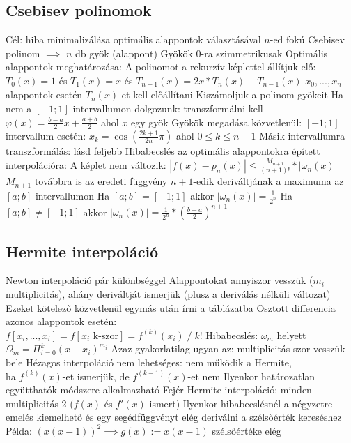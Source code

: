 \documentclass[12pt,a4paper]{article}
\begin{document}
\pagebreak

\subsection{Csebisev polinomok}

\begin{outline}
	\1 Cél: hiba minimalizálása optimális alappontok választásával
	\1 $n$-ed fokú Csebisev polinom $\implies$ $n$ db gyök (alappont)
		\2 Gyökök 0-ra szimmetrikusak
	\1 Optimális alappontok meghatározása:
		\2 A polinomot a rekurzív képlettel állítjuk elő:\\
		$T_0(x) = 1$ \;\;és\;\; $T_1(x) = x$ \;\;és\;\; $T_{n+1}(x) = 2x*T_n(x) - T_{n-1}(x)$
			\3 $x_0,...,x_n$ alappontok esetén $T_n(x)$-et kell előállítani
		\2 Kiszámoljuk a polinom gyökeit
		\2 Ha nem a $[-1;1]$ intervallumon dolgozunk: transzformálni kell
			\3 $\varphi(x) = \frac{b-a}{2}x+\frac{a+b}{2}$ \;\; ahol $x$ egy gyök
	\1 Gyökök megadása közvetlenül:
		\2 $[-1;1]$ intervallum esetén: $x_k = \cos(\frac{2k+1}{2n}\pi)$ ahol $0 \le k \le n-1$
		\2 Másik intervallumra transzformálás: lásd feljebb
	\1 Hibabecslés az optimális alappontokra épített interpolációra:
		\2 A képlet nem változik: $|f(x)-p_n(x)| \le \frac{M_{n+1}}{(n+1)!}*|\omega_n(x)|$
		\2 $M_{n+1}$ továbbra is az eredeti függvény $n+1$-edik deriváltjának a maximuma az $[a;b]$ intervallumon
		\2 Ha $[a;b]=[-1;1]$ akkor $|\omega_n(x)|=\frac{1}{2^n}$
		\2 Ha $[a;b] \ne [-1;1]$ akkor $|\omega_n(x)|=\frac{1}{2^n} * (\frac{b-a}{2})^{n+1}$
\end{outline}

\pagebreak

\subsection{Hermite interpoláció}

\begin{outline}
	\1 Newton interpoláció pár különbséggel
	\1 Alappontokat annyiszor vesszük ($m_i$ multiplicitás), ahány deriváltját ismerjük (plusz a deriválás nélküli változat)
		\2 Ezeket kötelező közvetlenül egymás után írni a táblázatba
	\1 Osztott differencia azonos alappontok esetén:\\
	$f[x_i,...,x_i] = f[x_i \text{ k-szor}] = f^{(k)}(x_i) \;/\; k!$
	\1 Hibabecslés: $\omega_m$ helyett $\Omega_m = \Pi_{i=0}^k (x-x_i)^{m_i}$
		\2 Azaz gyakorlatilag ugyan az: multiplicitás-szor vesszük bele
	\1 Hézagos interpoláció nem lehetséges: nem működik a Hermite,\\
	ha $f^{(k)}(x)$-et ismerjük, de $f^{(k-1)}(x)$-et nem
		\2 Ilyenkor határozatlan együtthatók módszere alkalmazható
	\1 Fejér-Hermite interpoláció: minden multiplicitás 2 ($f(x)$ és $f'(x)$ ismert)
		\2 Ilyenkor hibabecslésnél a négyzetre emelés kiemelhető és egy segédfüggvényt elég deriválni a szélsőérték kereséshez
			\3 Példa: $(x(x-1))^2 \implies g(x) := x(x-1)$ szélsőértéke elég
\end{outline}
\end{document}

